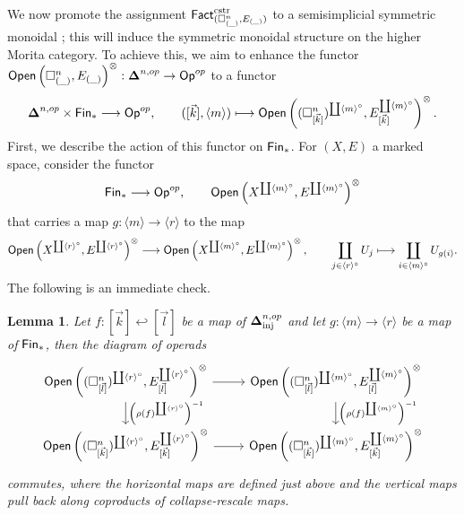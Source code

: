 \documentclass[10pt, reqno, twoside
, final
]{amsart}
\numberwithin{equation}{subsection}%
\theoremstyle{definition}
\theoremstyle{definition}
\theoremstyle{definition}
\theoremstyle{definition}
\theoremstyle{definition}
\theoremstyle{definition}
\theoremstyle{definition}
\theoremstyle{definition}
\theoremstyle{definition}
\theoremstyle{plain}
\theoremstyle{definition}
\theoremstyle{plain}
\theoremstyle{definition}
\theoremstyle{plain}
\theoremstyle{definition}
\theoremstyle{definition}
\theoremstyle{plain}
\newtheorem{lem}[defn]{Lemma}
\theoremstyle{plain}
\theoremstyle{definition}
\theoremstyle{plain}
\theoremstyle{plain}
\theoremstyle{plain}
\begin{document}
We now promote the assignment $\mathsf{Fact}^{\mathrm{cstr}}_{(\square^n_{(\_)},E_{(\_)})}$ to a semisimplicial symmetric monoidal \infcatt; this will induce the symmetric monoidal structure on the higher Morita category. To achieve this, we aim to enhance the functor $\mathsf{Open} \left(\square^n_{(\_)},E_{(\_)}\right)^{\otimes}:\boldsymbol{\Delta}^{n,op}\rightarrow \mathsf{Op}^{op}$ to a functor 
\begin{equation}\label{eq:symmonenhance}\boldsymbol{\Delta}^{n,op}\times \mathsf{Fin}_*\longrightarrow \mathsf{Op}^{op},\quad\quad ([\vec{k}],\langle m\rangle )\longmapsto \mathsf{Open} \left((\square^n_{[\vec{k}]})^{\coprod \langle m\rangle^{\circ} },E_{[\vec{k}]}^{\coprod \langle m\rangle^{\circ} }\right)^{\otimes}.\end{equation}
First, we describe the action of this functor on $\mathsf{Fin}_*$. For $(X,E)$ a marked space, consider the functor 
\[   \mathsf{Fin}_* \longrightarrow \mathsf{Op}^{op},\quad\quad \mathsf{Open}\left(X^{\coprod \langle m\rangle^{\circ}},E^{\coprod \langle m\rangle^{\circ}} \right)^{\otimes}\]
that carries a map $g:\langle m\rangle\rightarrow \langle r\rangle$ to the map
\[\mathsf{Open}\left(X^{\coprod \langle r\rangle^{\circ}},E^{\coprod \langle r\rangle^{\circ}} \right)^{\otimes}\longrightarrow \mathsf{Open}\left(X^{\coprod \langle m\rangle^{\circ}},E^{\coprod \langle m\rangle^{\circ}} \right)^{\otimes},\quad\quad \coprod_{j\in \langle r\rangle^{\circ}}U_j\longmapsto \coprod_{i\in \langle m\rangle^{\circ} } U_{g(i)}.  \]
The following is an immediate check.
\begin{lem}
Let $f:[\vec{k}]\hookleftarrow [\vec{l}]$ be a map of $\boldsymbol{\Delta}^{n,op}_{\mathrm{inj}}$ and let $g:\langle m\rangle\rightarrow \langle r\rangle$ be a map of $\mathsf{Fin}_*$, then the diagram of operads
\begin{equation}\label{eq:operadscommute}
\begin{tikzcd}
    \open \left((\square^n_{[\vec{l}]})^{\coprod \langle r\rangle^{\circ} },E_{[\vec{l}]}^{\coprod \langle r\rangle^{\circ} }\right)^{\otimes} \ar[d,"\left(\rho(f)^{\coprod\langle r\rangle^{\circ}}\right)^{-1}"] \ar[r] &\open \left((\square^n_{[\vec{l}]})^{\coprod \langle m\rangle^{\circ} },E_{[\vec{l}]}^{\coprod \langle m\rangle^{\circ} }\right)^{\otimes}\ar[d,"\left(\rho(f)^{\coprod\langle m\rangle^{\circ}}\right)^{-1}"]\\
    \open \left((\square^n_{[\vec{k}]})^{\coprod \langle r\rangle^{\circ} },E_{[\vec{k}]}^{\coprod \langle r\rangle^{\circ} }\right)^{\otimes}\ar[r] & \open \left((\square^n_{[\vec{k}]})^{\coprod \langle m\rangle^{\circ} },E_{[\vec{k}]}^{\coprod \langle m\rangle^{\circ} }\right)^{\otimes}
\end{tikzcd}
\end{equation}
commutes, where the horizontal maps are defined just above and the vertical maps pull back along coproducts of collapse-rescale maps.
\end{lem}
\end{document}
